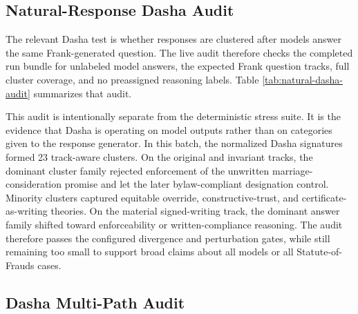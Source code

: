 \subsection{Natural-Response Dasha Audit}

The relevant Dasha test is whether responses are clustered after models answer
the same Frank-generated question. The live audit therefore checks the completed
run bundle for unlabeled model answers, the expected Frank question tracks, full
cluster coverage, and no preassigned reasoning labels. Table
\ref{tab:natural-dasha-audit} summarizes that audit.

\begin{table}[h]
\centering
\caption{Natural-response Dasha audit for the live model batch.}
\label{tab:natural-dasha-audit}

\end{table}

This audit is intentionally separate from the deterministic stress suite. It is
the evidence that Dasha is operating on model outputs rather than on categories
given to the response generator. In this batch, the normalized Dasha signatures
formed 23 track-aware clusters. On the original and invariant tracks, the
dominant cluster family rejected enforcement of the unwritten marriage-
consideration promise and let the later bylaw-compliant designation control.
Minority clusters captured equitable override, constructive-trust, and
certificate-as-writing theories. On the material signed-writing track, the
dominant answer family shifted toward enforceability or written-compliance
reasoning. The audit therefore passes the configured divergence and
perturbation gates, while still remaining too small to support broad claims
about all models or all Statute-of-Frauds cases.

\begin{table}[h]
\centering
\caption{Dasha cluster summary for the live natural-response run.}
\label{tab:dasha-cluster-summary}

\end{table}

\begin{table}[h]
\centering
\caption{Projected model rankings from centroid scores.}
\label{tab:model-rankings}

\end{table}

\subsection{Dasha Multi-Path Audit}

